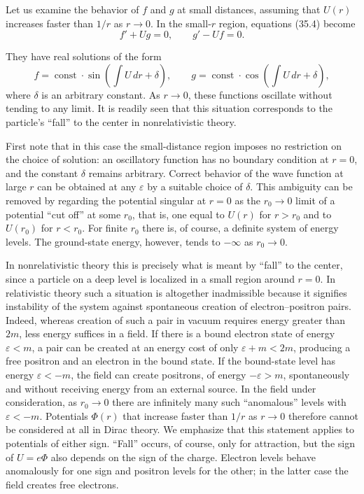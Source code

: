 Let us examine the behavior of $f$ and $g$ at small distances, assuming that $U(r)$ increases faster than $1/r$ as $r\to0$. In the small-$r$ region, equations (35.4) become
\[
f'+Ug=0,
\qquad
g'-Uf=0.
\]

They have real solutions of the form
\begin{equation}
f=\operatorname{const}\cdot\sin\left(\int U\,dr+\delta\right),
\qquad
g=\operatorname{const}\cdot\cos\left(\int U\,dr+\delta\right),
\tag{35.6}
\end{equation}
where $\delta$ is an arbitrary constant. As $r\to0$, these functions oscillate without tending to any limit. It is readily seen that this situation corresponds to the particle's ``fall'' to the center in nonrelativistic theory.

First note that in this case the small-distance region imposes no restriction on the choice of solution: an oscillatory function has no boundary condition at $r=0$, and the constant $\delta$ remains arbitrary. Correct behavior of the wave function at large $r$ can be obtained at any $\varepsilon$ by a suitable choice of $\delta$. This ambiguity can be removed by regarding the potential singular at $r=0$ as the $r_0\to0$ limit of a potential ``cut off'' at some $r_0$, that is, one equal to $U(r)$ for $r>r_0$ and to $U(r_0)$ for $r<r_0$. For finite $r_0$ there is, of course, a definite system of energy levels. The ground-state energy, however, tends to $-\infty$ as $r_0\to0$.

In nonrelativistic theory this is precisely what is meant by ``fall'' to the center, since a particle on a deep level is localized in a small region around $r=0$. In relativistic theory such a situation is altogether inadmissible because it signifies instability of the system against spontaneous creation of electron--positron pairs. Indeed, whereas creation of such a pair in vacuum requires energy greater than $2m$, less energy suffices in a field. If there is a bound electron state of energy $\varepsilon<m$, a pair can be created at an energy cost of only $\varepsilon+m<2m$, producing a free positron and an electron in the bound state. If the bound-state level has energy $\varepsilon<-m$, the field can create positrons, of energy $-\varepsilon>m$, spontaneously and without receiving energy from an external source. In the field under consideration, as $r_0\to0$ there are infinitely many such ``anomalous'' levels with $\varepsilon<-m$. Potentials $\Phi(r)$ that increase faster than $1/r$ as $r\to0$ therefore cannot be considered at all in Dirac theory. We emphasize that this statement applies to potentials of either sign. ``Fall'' occurs, of course, only for attraction, but the sign of $U=e\Phi$ also depends on the sign of the charge. Electron levels behave anomalously for one sign and positron levels for the other; in the latter case the field creates free electrons.

